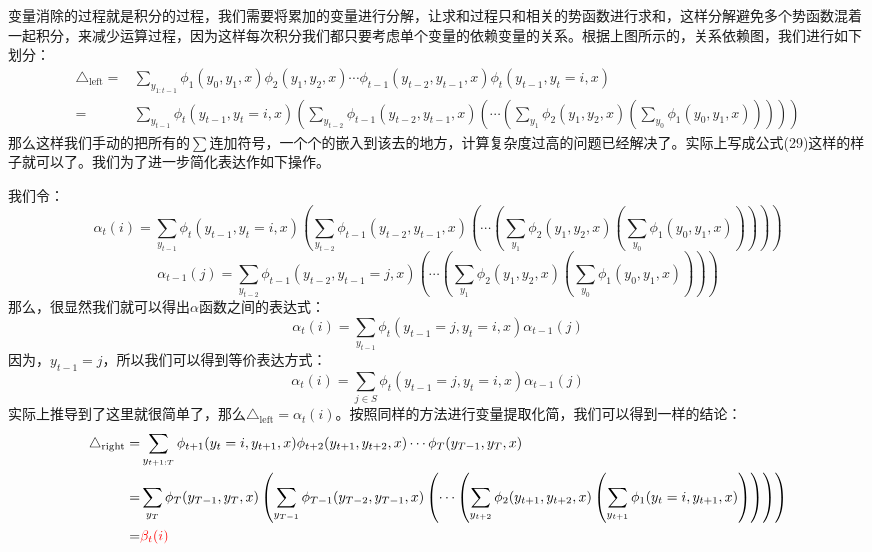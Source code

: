 \documentclass[a4paper]{article}
\begin{document}
变量消除的过程就是积分的过程，我们需要将累加的变量进行分解，让求和过程只和相关的势函数进行求和，这样分解避免多个势函数混着一起积分，来减少运算过程，因为这样每次积分我们都只要考虑单个变量的依赖变量的关系。根据上图所示的，关系依赖图，我们进行如下划分：
\begin{equation}
    \begin{split}
        \triangle_{\mathrm{left}} = & \sum_{y_{1:t-1}} \phi_1(y_0,y_1,x)\phi_2(y_1,y_2,x)\cdots\phi_{t-1}(y_{t-2},y_{t-1},x)\phi_{t}(y_{t-1},y_{t}=i,x) \\
        = & \sum_{y_{t-1}} \phi_{t}(y_{t-1},y_{t}=i,x) \left( \sum_{y_{t-2}} \phi_{t-1}(y_{t-2},y_{t-1},x) \left( \cdots \left( \sum_{y_1} \phi_2(y_1,y_2,x) \left(\sum_{y_0}\phi_1(y_0,y_1,x)\right)\right) \right)\right)
    \end{split}
\end{equation}
那么这样我们手动的把所有的$\sum$连加符号，一个个的嵌入到该去的地方，计算复杂度过高的问题已经解决了。实际上写成公式(29)这样的样子就可以了。我们为了进一步简化表达作如下操作。

我们令：
$$
\alpha_t(i) = \sum_{y_{t-1}} \phi_{t}(y_{t-1},y_{t}=i,x) \left( \sum_{y_{t-2}} \phi_{t-1}(y_{t-2},y_{t-1},x) \left( \cdots \left( \sum_{y_1} \phi_2(y_1,y_2,x) \left(\sum_{y_0}\phi_1(y_0,y_1,x)\right)\right) \right)\right)
$$
$$
\alpha_{t-1}(j) =  \sum_{y_{t-2}} \phi_{t-1}(y_{t-2},y_{t-1}=j,x) \left( \cdots \left( \sum_{y_1} \phi_2(y_1,y_2,x) \left(\sum_{y_0}\phi_1(y_0,y_1,x)\right)\right) \right)
$$
那么，很显然我们就可以得出$\alpha$函数之间的表达式：
\begin{equation}
    \alpha_t(i) = \sum_{y_{t-1}} \phi_{t}(y_{t-1}=j,y_{t}=i,x) \alpha_{t-1}(j)
\end{equation}
因为，$y_{t-1}=j$，所以我们可以得到等价表达方式：
\begin{equation}
    \alpha_t(i) = \sum_{j\in S} \phi_{t}(y_{t-1}=j,y_{t}=i,x) \alpha_{t-1}(j)
\end{equation}
实际上推导到了这里就很简单了，那么$\triangle_{\mathrm{left}} = \alpha_t(i)$。按照同样的方法进行变量提取化简，我们可以得到一样的结论：
\begin{equation}
\begin{split}
    \triangle_{\mathrm{right}} = & \sum_{y_{t+1:T}} \phi_{t+1}(y_{t}=i,y_{t+1},x)\phi_{t+2}(y_{t+1},y_{t+2},x)\cdots\phi_{T}(y_{T-1},y_{T},x)\\
    = & \sum_{y_{T}} \phi_{T}(y_{T-1},y_{T},x) \left( \sum_{y_{T-1}} \phi_{T-1}(y_{T-2},y_{T-1},x) \left( \cdots \left( \sum_{y_{t+2}} \phi_2(y_{t+1},y_{t+2},x) \left(\sum_{y_{t+1}}\phi_1(y_{t}=i,y_{t+1},x)\right)\right) \right)\right) \\
    = & {\color{red} \beta_t(i)}
\end{split}
\end{equation}
\end{document}

